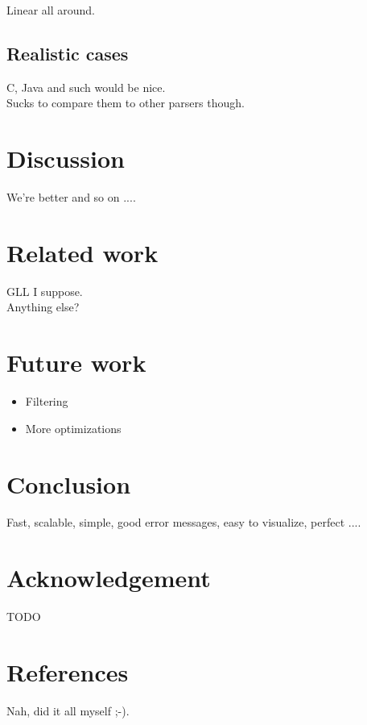 \documentclass[a4paper,10pt]{article}
\begin{document}
Linear all around.

\subsection{Realistic cases}

C, Java and such would be nice.\\
Sucks to compare them to other parsers though.

\section{Discussion}

We're better and so on ....

\section{Related work}

GLL I suppose.\\
Anything else?

\section{Future work}

\begin{itemize}
 \setlength{\itemsep}{0pt}
 \setlength{\parskip}{0pt}
 \setlength{\parsep}{0pt}
 
 \item Filtering
 \item More optimizations
\end{itemize}

\section{Conclusion}

Fast, scalable, simple, good error messages, easy to visualize, perfect ....

\section{Acknowledgement}

TODO

\section{References}

Nah, did it all myself ;-).
\end{document}
